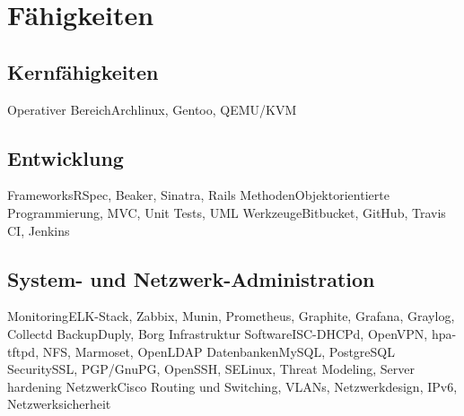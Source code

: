 

\maketitle

\section{Fähigkeiten}

\subsection{Kernfähigkeiten}
           {Operativer Bereich}{Archlinux\contributor, Gentoo, QEMU/KVM}

\subsection{Entwicklung}
           {Frameworks}{RSpec, Beaker, Sinatra, Rails}
           {Methoden}{Objektorientierte Programmierung, MVC, Unit Tests, UML}
           {Werkzeuge}{Bitbucket, GitHub, Travis CI, Jenkins}

\subsection{System- und Netzwerk-Administration}
           {Monitoring}{ELK-Stack, Zabbix, Munin, Prometheus, Graphite, Grafana, Graylog, Collectd}
           {Backup}{Duply, Borg}
           {Infrastruktur Software}{ISC-DHCPd, OpenVPN, hpa-tftpd, NFS, Marmoset, OpenLDAP}
           {Datenbanken}{MySQL, PostgreSQL}
           {Security}{SSL, PGP/GnuPG, OpenSSH, SELinux, Threat Modeling, Server hardening}
           {Netzwerk}{Cisco Routing und Switching, VLANs, Netzwerkdesign, IPv6, Netzwerksicherheit}

